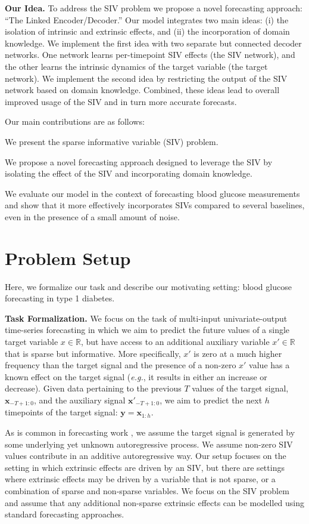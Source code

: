 \documentclass[letterpaper]{article}
\begin{document}
\textbf{Our Idea.} To address the SIV problem we propose a novel forecasting approach: ``The Linked Encoder/Decoder.''  Our model integrates two main ideas: (i) the isolation of intrinsic and extrinsic effects, and (ii) the incorporation of domain knowledge. We implement the first idea with two separate but connected decoder networks. One network learns per-timepoint SIV effects (the SIV network), and the other learns the intrinsic dynamics of the target variable (the target network). We implement the second idea by restricting the output of the SIV network based on domain knowledge. Combined, these ideas lead to overall improved usage of the SIV and in turn more accurate forecasts.

Our main contributions are as follows:


 We present the sparse informative variable (SIV) problem.

 We propose a novel forecasting approach designed to  leverage the SIV by isolating the effect of the SIV and incorporating domain knowledge.

 We evaluate our model in the context of forecasting blood glucose measurements and show that it more effectively incorporates SIVs compared to several baselines, even in the presence of a small amount of noise.




\section{Problem Setup}
Here, we formalize our task and describe our motivating setting: blood glucose forecasting in type 1 diabetes.

\textbf{Task Formalization.} We focus on the task of multi-input univariate-output time-series forecasting in which we aim to predict the future values of a single target variable $x\in\mathbb{R}$, but have access to an additional auxiliary variable $x'\in\mathbb{R}$ that is sparse but informative. More specifically, $x'$ is zero at a much higher frequency than the target signal and the presence of a non-zero $x'$ value has a known effect on the target signal (\textit{e.g.}, it results in either an increase or decrease). Given data pertaining to the previous $T$ values of the target signal, $\mathbf{x}_{-T+1:0}$, and the auxiliary signal $\mathbf{x}'_{-T+1:0}$, we aim to predict the next $h$ timepoints of the target signal: $\mathbf{y}=\mathbf{x}_{1:h}$.


As is common in forecasting work \cite{bbook}, we assume the target signal is generated by some underlying yet unknown autoregressive process. We assume  non-zero SIV values contribute in an additive autoregressive way.  Our setup focuses on the setting in which extrinsic effects are driven by an SIV, but there are settings where extrinsic effects may be driven by a variable that is not sparse, or a combination of sparse and non-sparse variables.  We focus on the SIV problem and assume that any additional non-sparse extrinsic effects can be modelled using standard forecasting approaches.
\end{document}
